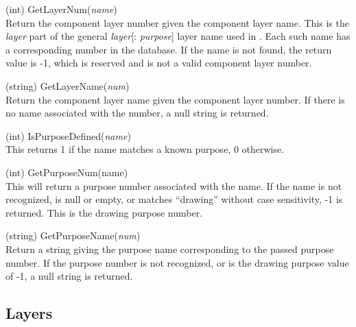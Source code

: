 \begin{description}
\item{(int) \vt GetLayerNum({\it name\/})}\\
Return the component layer number given the component layer name. 
This is the {\it layer} part of the general {\it layer\/}[{\vt :}{\it
purpose\/}] layer name used in {\Xic}.  Each such name has a
corresponding number in the database.  If the name is not found, the
return value is -1, which is reserved and is not a valid component
layer number.

\item{(string) \vt GetLayerName({\it num\/})}\\
Return the component layer name given the component layer number.  If
there is no name associated with the number, a null string is
returned.

\item{(int) \vt IsPurposeDefined({\it name\/})}\\
This returns 1 if the name matches a known purpose, 0 otherwise.

\item{(int) \vt GetPurposeNum({\vt name\/})}\\
This will return a purpose number associated with the name.  If the
name is not recognized, is null or empty, or matches ``{\vt drawing}''
without case sensitivity, -1 is returned.  This is the {\vt drawing}
purpose number.

\item{(string) \vt GetPurposeName({\it num\/})}\\
Return a string giving the purpose name corresponding to the passed
purpose number.  If the purpose number is not recognized, or is the
{\vt drawing} purpose value of -1, a null string is returned.
\end{description}


\subsection{Layers}

